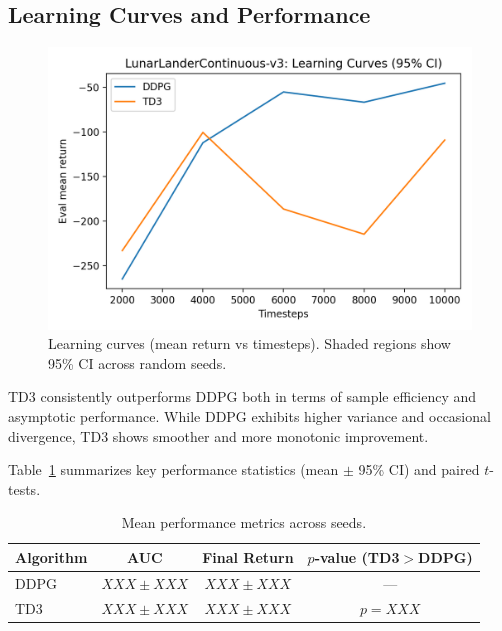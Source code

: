 \documentclass[10pt,letterpaper]{article}
\begin{document}
\subsection{Learning Curves and Performance}
\begin{figure}[h]
  \centering
  \includegraphics[width=.85\linewidth]{fig_learning_curves.png}
  \caption{Learning curves (mean return vs timesteps). Shaded regions show 95\% CI across random seeds.}
\end{figure}

TD3 consistently outperforms DDPG both in terms of sample efficiency and asymptotic performance. While DDPG exhibits higher variance and occasional divergence, TD3 shows smoother and more monotonic improvement.

Table~\ref{tab:performance} summarizes key performance statistics (mean $\pm$ 95\% CI) and paired $t$-tests.

\begin{table}[h]
\centering
\begin{tabular}{lccc}
\toprule
Algorithm & AUC & Final Return & $p$-value (TD3$>$DDPG) \\
\midrule
DDPG & $XXX \pm XXX$ & $XXX \pm XXX$ & --- \\
TD3  & $XXX \pm XXX$ & $XXX \pm XXX$ & $p = XXX$ \\
\bottomrule
\end{tabular}
\caption{Mean performance metrics across seeds.}
\label{tab:performance}
\end{table}
\end{document}
